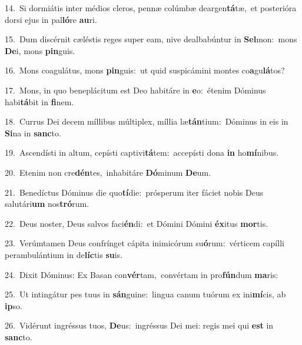 {\numbfont\textcolor{\numbcolor}{14.}}~Si dormiátis inter médios cleros, pennæ colúmbæ deargen\-\textbf{tá}\-tæ,~\star et posterióra dorsi ejus in pal\-\textbf{ló}\-re \textbf{au}\-ri.\par
{\numbfont\textcolor{\numbcolor}{15.}}~Dum discérnit cæléstis reges super eam, nive dealbabúntur in \textbf{Sel}\-mon:~\star mons \textbf{De}\-i, mons \textbf{pin}\-guis.\par
{\numbfont\textcolor{\numbcolor}{16.}}~Mons coagulátus, mons \textbf{pin}\-guis:~\star ut quid suspicámini montes co\-\textbf{a}\-gu\-\textbf{lá}\-tos?\par
{\numbfont\textcolor{\numbcolor}{17.}}~Mons, in quo beneplácitum est Deo habitáre in \textbf{e}\-o:~\star étenim Dóminus habi\-\textbf{tá}\-bit in \textbf{fi}\-nem.\par
{\numbfont\textcolor{\numbcolor}{18.}}~Currus Dei decem míllibus múltiplex, míllia læ\-\textbf{tán}\-tium:~\star Dóminus in eis in \textbf{Si}\-na in \textbf{sanc}\-to.\par
{\numbfont\textcolor{\numbcolor}{19.}}~Ascendísti in altum, cepísti captivi\-\textbf{tá}\-tem:~\star accepísti dona \textbf{in} ho\-\textbf{mí}\-nibus.\par
{\numbfont\textcolor{\numbcolor}{20.}}~Etenim non cre\-\textbf{dén}\-tes,~\star inhabitáre \textbf{Dó}\-minum \textbf{De}\-um.\par
{\numbfont\textcolor{\numbcolor}{21.}}~Benedíctus Dóminus die quo\-\textbf{tí}\-die:~\star prósperum iter fáciet nobis Deus salutári\textbf{um} nos\-\textbf{tró}\-rum.\par
{\numbfont\textcolor{\numbcolor}{22.}}~Deus noster, Deus salvos faci\-\textbf{én}\-di:~\star et Dómini Dómini \textbf{éx}\-itus \textbf{mor}\-tis.\par
{\numbfont\textcolor{\numbcolor}{23.}}~Verúmtamen Deus confrínget cápita inimicórum su\-\textbf{ó}\-rum:~\star vérticem capílli perambulántium in de\-\textbf{líc}\-tis \textbf{su}\-is.\par
{\numbfont\textcolor{\numbcolor}{24.}}~Dixit Dóminus: Ex Basan con\-\textbf{vér}\-tam,~\star convértam in pro\-\textbf{fún}\-dum \textbf{ma}\-ris:\par
{\numbfont\textcolor{\numbcolor}{25.}}~Ut intingátur pes tuus in \textbf{sán}\-guine:~\star lingua canum tuórum ex ini\-\textbf{mí}\-cis, ab \textbf{ip}\-so.\par
{\numbfont\textcolor{\numbcolor}{26.}}~Vidérunt ingréssus tuos, \textbf{De}\-us:~\star ingréssus Dei mei: regis mei qui \textbf{est} in \textbf{sanc}\-to.\par
